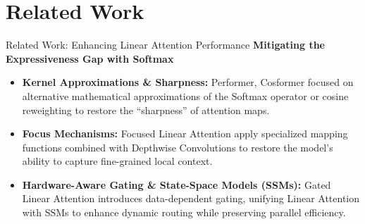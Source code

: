 \documentclass{beamer}
\begin{document}
\section{Related Work}

\begin{frame}{Related Work: Enhancing Linear Attention Performance}
	\textbf{Mitigating the Expressiveness Gap with Softmax}
	\vspace{0.2cm}
	\begin{itemize}
		\item \textbf{Kernel Approximations \& Sharpness:} Performer, Cosformer focused on alternative mathematical approximations of the Softmax operator or cosine reweighting to restore the ``sharpness'' of attention maps.
		\item \textbf{Focus Mechanisms:} Focused Linear Attention apply specialized mapping functions combined with Depthwise Convolutions to restore the model's ability to capture fine-grained local context.
		\item \textbf{Hardware-Aware Gating \& State-Space Models (SSMs):} Gated Linear Attention introduces data-dependent gating, unifying Linear Attention with SSMs to enhance dynamic routing while preserving parallel efficiency.
	\end{itemize}
\end{frame}
\end{document}

